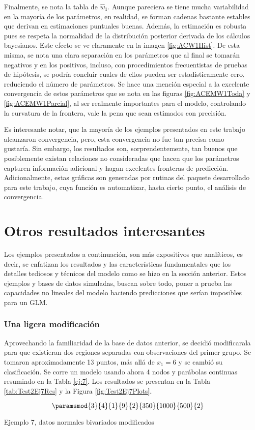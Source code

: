 Finalmente, se nota la tabla de $\hat{w}_1$. Aunque pareciera se tiene mucha variabilidad en la mayoría de los parámetros, en realidad, se forman cadenas bastante estables que derivan en estimaciones puntuales buenas. Además, la estimación es robusta pues se respeta la normalidad de la distribución posterior derivada de los cálculos bayesianos. Este efecto se ve claramente en la imagen \ref{fig:ACW1Hist}. De esta misma, se nota una clara separación en los parámetros que al final se tomarán negativos y en los positivos, incluso, con procedimientos frecuentistas de pruebas de hipótesis, se podría concluir cuales de ellos pueden ser estadísticamente cero, reduciendo el número de parámetros. Se hace una mención especial a la excelente convergencia de estos parámetros que se nota en las figuras \ref{fig:ACEMW1Toda}
y \ref{fig:ACEMW1Parcial}, al ser realmente importantes para el modelo, controlando la curvatura de la frontera, vale la pena que sean estimados con precisión.

Es interesante notar, que la mayoría de los ejemplos presentados en este trabajo alcanzaron convergencia, pero, esta convergencia no fue tan precisa como gustaría. Sin embargo, los resultados son, sorprendentemente, tan buenos que posiblemente existan relaciones no consideradas que hacen que los parámetros capturen información adicional y hagan excelentes fronteras de predicción. Adicionalmente, estas gráficas son generadas por rutinas del paquete desarrollado para este trabajo, cuya función es automatizar, hasta cierto punto, el análisis de convergencia.

\section{Otros resultados interesantes}
Los ejemplos presentados a continuación, son más expositivos que analíticos, es decir, se enfatizan los resultados y las características fundamentales que los detalles tediosos y técnicos del modelo como se hizo en la sección anterior. Estos ejemplos y bases de datos simuladas, buscan sobre todo, poner a prueba las capacidades no lineales del modelo haciendo predicciones que serían imposibles para un GLM.

\subsubsection*{Una ligera modificación}
Aprovechando la familiaridad de la base de datos anterior, se decidió modificarala para que existieran dos regiones separadas con observaciones del primer grupo. Se tomaron aproximadamente 13 puntos, más allá de $x_1 = 6$ y se cambió su clasificación. Se corre un modelo usando ahora 4 nodos y parábolas continuas resumindo en la Tabla \ref{ej:7}. Los resultados se presentan en la Tabla \ref{tab:Test2Ej7Res} y la Figura \ref{fig:Test2Ej7Plots}.
\begin{table}[h]
$$\paramsmod{3}{4}{1}{9}{2}{350}{1000}{500}{2}$$
\caption{Ejemplo 7, datos normales bivariados modificados}
\label{ej:7}
\end{table}

